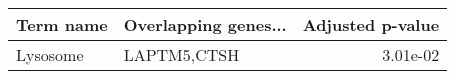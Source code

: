 \begin{tabular}{llr}
\toprule
Term name & Overlapping genes... &  Adjusted p-value \\
\midrule
 Lysosome &          LAPTM5,CTSH &          3.01e-02 \\
\bottomrule
\end{tabular}
